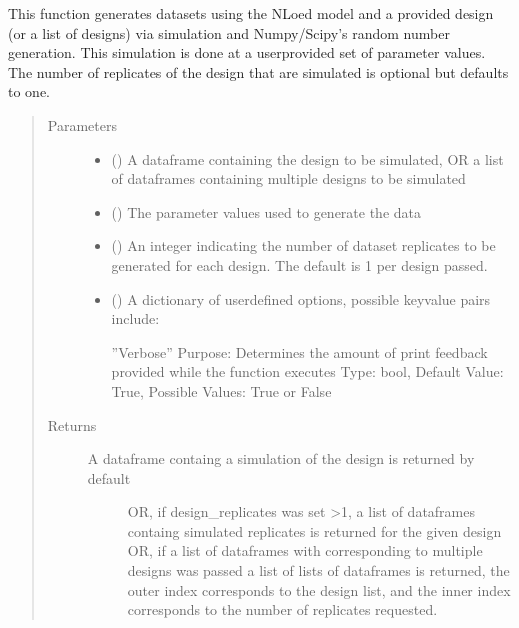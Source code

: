 \documentclass[letterpaper,10pt,english,openany,oneside]{sphinxmanual}
\begin{document}
\begin{fulllineitems}
\begin{fulllineitems}
This function generates datasets using the NLoed model and a provided design (or a list of
designs) via simulation and Numpy/Scipy’s random number generation. This simulation is done
at a user\sphinxhyphen{}provided set of parameter values. The number of replicates of the design that are
simulated is optional but defaults to one.
\begin{quote}\begin{description}
\item[{Parameters}] \leavevmode\begin{itemize}
\item {} 
 () \textendash{} A dataframe containing the design to be simulated,
OR a list of dataframes containing multiple designs to be simulated

\item {} 
 () \textendash{} The parameter values used to generate the data

\item {} 
 (\sphinxstyleliteralemphasis{\sphinxupquote{, }}) \textendash{} An integer indicating the number of dataset
replicates to be generated for each design. The default is 1 per design passed.

\item {} 
 (\sphinxstyleliteralemphasis{\sphinxupquote{, }}) \textendash{} 
A dictionary of user\sphinxhyphen{}defined options, possible key\sphinxhyphen{}value pairs
include:

”Verbose” \textendash{}
Purpose: Determines the amount of print feedback provided while the function executes
Type: bool,
Default Value: True,
Possible Values: True or False


\end{itemize}

\item[{Returns}] \leavevmode
\begin{description}
\item[{A dataframe containg a simulation of the design is returned by default}] \leavevmode
OR, if design\_replicates was set \textgreater{}1, a list of dataframes containg simulated
replicates is returned for the given design
OR,  if a list of dataframes with corresponding to multiple designs was passed
a list of lists of dataframes is returned, the outer index corresponds to the design
list, and the inner index corresponds to the number of replicates requested.


\end{description}
\end{description}
\end{quote}
\end{fulllineitems}
\end{fulllineitems}
\end{document}
